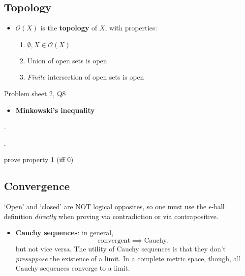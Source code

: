 \subsection{Topology}

\begin{itemize}
    \item $\mathcal{O}(X)$ is the \textbf{topology} of $X$, with properties:
        \begin{enumerate}
            \item $\emptyset, X \in \mathcal{O}(X)$
            \item Union of open sets is open
            \item \textit{Finite} intersection of open sets is open
        \end{enumerate}
\end{itemize}

\begin{problem}{Problem sheet 2, Q8}{}


    
    
\end{problem}

\begin{itemize}
    \item \textbf{Minkowski's inequality}
\end{itemize}

\begin{problem}{5}{}
    .
\end{problem}

\begin{problem}{6}{}
    .    
\end{problem}

\begin{problem}{12}{}
    prove property 1 (iff 0)
\end{problem}

\subsection{Convergence}

 `Open' and `closed' are NOT logical opposites, so one must use the $\epsilon$-ball definition \textit{directly} when proving via contradiction or via contrapositive.

\begin{itemize}
    \item \textbf{Cauchy sequences}: in general,
        $$ \text{convergent} \implies \text{Cauchy} , $$
    but not vice versa. The utility of Cauchy sequences is that they don't \textit{presuppose} the existence of a limit. In a complete metric space, though, all Cauchy sequences converge to a limit.
\end{itemize}

